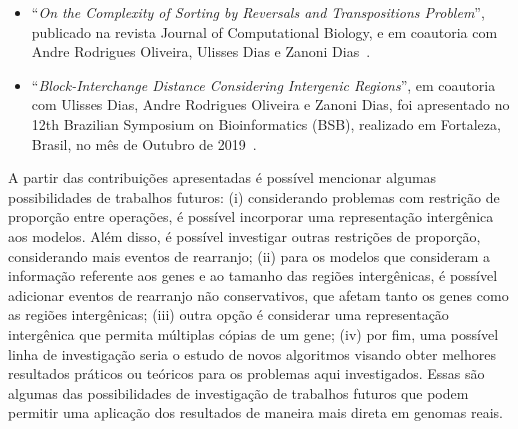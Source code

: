 \begin{itemize}
  \item ``\textit{On the Complexity of Sorting by Reversals and Transpositions Problem}'', publicado na revista Journal of Computational Biology, e em coautoria com Andre Rodrigues Oliveira, Ulisses Dias e Zanoni Dias~\cite{2019b-oliveira-etal}.

  \item ``\textit{Block-Interchange Distance Considering Intergenic Regions}'', em coautoria com Ulisses Dias, Andre Rodrigues Oliveira e Zanoni Dias, foi apresentado no 12th Brazilian Symposium on Bioinformatics (BSB), realizado em Fortaleza, Brasil, no mês de Outubro de 2019~\cite{2019-dias-etal}.
\end{itemize}

A partir das contribuições apresentadas é possível mencionar algumas possibilidades de trabalhos futuros: (i) considerando problemas com restrição de proporção entre operações, é possível incorporar uma representação intergênica aos modelos. Além disso, é possível investigar outras restrições de proporção, considerando mais eventos de rearranjo; (ii) para os modelos que consideram a informação referente aos genes e ao tamanho das regiões intergênicas, é possível adicionar eventos de rearranjo não conservativos, que afetam tanto os genes como as regiões intergênicas; (iii) outra opção é considerar uma representação intergênica que permita múltiplas cópias de um gene; (iv) por fim, uma possível linha de investigação seria o estudo de novos algoritmos visando obter melhores resultados práticos ou teóricos para os problemas aqui investigados.  Essas são algumas das possibilidades de investigação de trabalhos futuros que podem permitir uma aplicação dos resultados de maneira mais direta em genomas reais. 